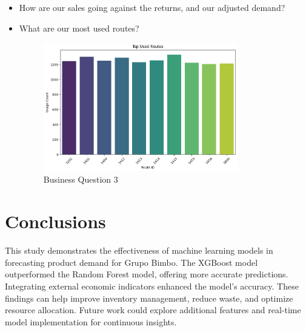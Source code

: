\documentclass{article}
\begin{document}
\begin{itemize}
    \item How are our sales going against the returns, and our adjusted demand?



    \item What are our most used routes?

    \begin{figure}[H] 
        \begin{center}
        \centering
        \includegraphics[width=0.8\textwidth]{images/quest4.png}
        \caption{Business Question 3}
        \end{center}
    \end{figure}

\end{itemize}

\section{Conclusions}
This study demonstrates the effectiveness of machine learning models in forecasting product demand for Grupo Bimbo. The XGBoost model outperformed the Random Forest model, offering more accurate predictions. Integrating external economic indicators enhanced the model's accuracy. These findings can help improve inventory management, reduce waste, and optimize resource allocation. Future work could explore additional features and real-time model implementation for continuous insights.
\end{document}
